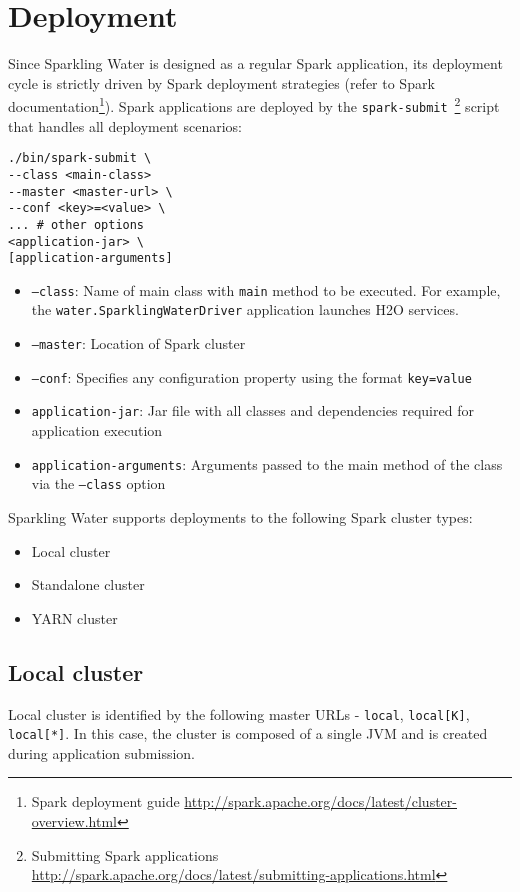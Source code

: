 \section{Deployment}
Since Sparkling Water is designed as a regular Spark application, its deployment cycle is strictly driven by Spark deployment strategies (refer to Spark documentation\footnote{Spark deployment guide \url{http://spark.apache.org/docs/latest/cluster-overview.html}}). Spark applications are deployed by the \texttt{spark-submit}~\footnote{Submitting Spark applications \url{http://spark.apache.org/docs/latest/submitting-applications.html}} script that handles all deployment scenarios:

\begin{lstlisting}[style=Bash]
./bin/spark-submit \
--class <main-class>
--master <master-url> \
--conf <key>=<value> \
... # other options
<application-jar> \
[application-arguments]
\end{lstlisting}

\begin{itemize}
	\item \texttt{--class}: Name of main class with \texttt{main} method to be executed. For example, the \texttt{water.SparklingWaterDriver} application launches H2O services.
	\item \texttt{--master}: Location of Spark cluster
	\item \texttt{--conf}: Specifies any configuration property using the format \texttt{key=value}
	\item \texttt{application-jar}: Jar file with all classes and dependencies required for application execution
	\item \texttt{application-arguments}: Arguments passed to the main method of the class via the \texttt{--class} option
\end{itemize}


Sparkling Water supports deployments to the following Spark cluster types:
\begin{itemize}
	\item{Local cluster}
	\item{Standalone cluster} 
	\item{YARN cluster}
\end{itemize}

\subsection{Local cluster}
Local cluster is identified by the following master URLs - \texttt{local}, \texttt{local[K]}, \texttt{local[*]}. In this case, the cluster is composed of a single JVM and is created during application submission.

